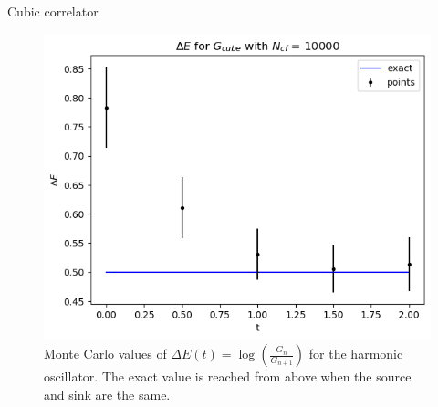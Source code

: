 \documentclass{beamer}
\begin{document}
\begin{frame}{Cubic correlator}
    \begin{figure}
        \centering
        \includegraphics[width=0.5\linewidth]{cubic_propagator.png}
        \caption{Monte Carlo values of $\Delta E(t) = \log \left( \frac{G_n}{G_{n+1}} \right)$ for the harmonic oscillator. The exact value is reached from above when the source and sink are the same.}
        \label{fig:cubic_propagator}
    \end{figure}
\end{frame}
\end{document}
